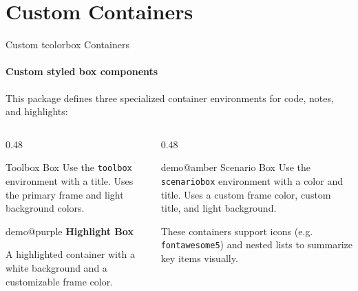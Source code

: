 
\section{Custom Containers}

\begin{frame}[fragile]{Custom tcolorbox Containers}
\framesubtitle{Custom styled box components}
This package defines three specialized container environments for code, notes, and highlights:
\begin{columns}[T]
    \begin{column}{0.48\textwidth}
        \raggedright
        \begin{toolbox}{\faBriefcase\; Toolbox Box}
            \footnotesize
            Use the \texttt{toolbox} environment with a title.
            Uses the primary frame and light background colors.
        \end{toolbox}
        
        \vspace{0.2cm}
        
        \begin{highlightbox}{demo@purple}
            \footnotesize
            \textbf{\faInfoCircle\; Highlight Box}
            
            A highlighted container with a white background and a customizable frame color.
        \end{highlightbox}
    \end{column}
    \begin{column}{0.48\textwidth}
        \raggedright
        \begin{scenariobox}{demo@amber}{\faExclamationTriangle\; Scenario Box}
            \footnotesize
            Use the \texttt{scenariobox} environment with a color and title.
            Uses a custom frame color, custom title, and light background.
        \end{scenariobox}
        
        \vspace{0.1cm}
        \scriptsize
        These containers support icons (e.g. \texttt{fontawesome5}) and nested lists to summarize key items visually.
    \end{column}
\end{columns}
\end{frame}

